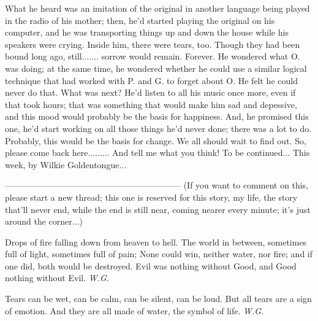 What he heard was an imitation of the original in another language being played in the radio of his mother; then, he'd started playing the original on his computer, and he was transporting things up and down the house while his speakers were crying. 
Inside him, there were tears, too. Though they had been bound long ago, still....... sorrow would remain. Forever. 
He wondered what O. was doing; at the same time, he wondered whether he could use a similar logical technique that had worked with P. and G. to forget about O. He felt he could never do that. What was next? He'd listen to all his music once more, even if that took hours; that was something that would make him sad and depessive, and this mood would probably be the basis for happiness. And, he promised this one, he'd start working on all those things he'd never done; there was a lot to do. 
Probably, this would be the basis for change. 
We all should wait to find out. 
So, please come back here.........
And tell me what you think!
To be continued...
This week, by Wilkie Goldentongue...

--------------------------------------------------------------
(If you want to comment on this, please start a new thread; this one is reserved for this story, my life, the story that'll never end, while the end is still near, coming nearer every minute; it's just around the corner...)

Drops of fire 
falling down 
from heaven to hell. 
The world in between, 
sometimes full of light, 
sometimes full of pain; 
None could win, 
neither water, 
nor fire; 
and if one did, 
both would be destroyed. 
Evil was nothing without Good, 
and Good nothing without Evil. 
\emph{W.G.}

Tears 
can be wet, 
can be calm, 
can be silent, 
can be loud. 
But all tears are a sign 
of emotion. 
And they are all made of water, 
the symbol of life. 
\emph{W.G.}
